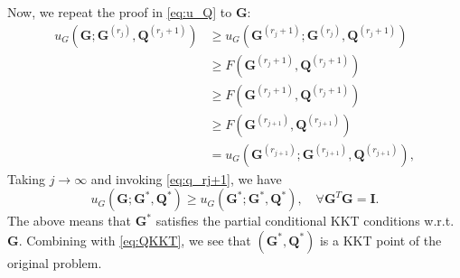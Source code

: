 \documentclass[10pt,journal]{IEEEtran}
\newcommand{\G}{\boldsymbol{G}}
\begin{document}
Now, we repeat the proof in \eqref{eq:u_Q} to ${\bm G}$:
\begin{subequations}\label{eq:u_G}
\begin{align}
         u_G\left({\bm G};{\bm G}^{(r_j)},{\bm Q}^{(r_j+1)}\right) &\geq u_G\left({\bm G}^{(r_j+1)};{\bm G}^{(r_j)},{\bm Q}^{(r_j+1)}\right) \\
				                              &\geq F({\bm G}^{(r_j+1)},{\bm Q}^{(r_j+1)})\\					
                                               &\geq F\left({\bm G}^{(r_j+1)},{\bm Q}^{(r_j+1)}\right)  \\
											  &\geq F\left({\bm G}^{(r_{j+1})},{\bm Q}^{(r_{j+1})}\right)  \\
											   & = u_G\left({\bm G}^{(r_{j+1})};{\bm G}^{(r_{j+1})},{\bm Q}^{(r_{j+1})}\right), 
\end{align}
\end{subequations}
Taking $j\rightarrow \infty$ and invoking \eqref{eq:q_rj+1}, we have
\[ u_G\left({\bm G};{\bm G}^{\ast},{\bm Q}^{\ast}\right) \geq u_G\left({\bm G}^{\ast};{\bm G}^{\ast},{\bm Q}^{\ast}\right),\quad \forall \G^T\G={\bm I}. \]
The above means that $\G^\ast$ satisfies the partial conditional KKT conditions w.r.t. $\G$.
Combining with \eqref{eq:QKKT}, we see that $({\bm G}^\ast,{\bm Q}^\ast)$ is a KKT point of the original problem. 

\bigskip
\end{document}
